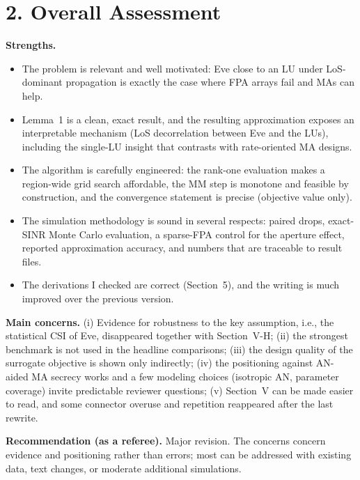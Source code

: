 \documentclass[10.5pt,a4paper]{article}
\begin{document}
\section*{2. Overall Assessment}
\textbf{Strengths.}
\begin{itemize}
\item The problem is relevant and well motivated: Eve close to an LU under LoS-dominant propagation is exactly the case where FPA arrays fail and MAs can help.
\item Lemma~1 is a clean, exact result, and the resulting approximation exposes an interpretable mechanism (LoS decorrelation between Eve and the LUs), including the single-LU insight that contrasts with rate-oriented MA designs.
\item The algorithm is carefully engineered: the rank-one evaluation makes a region-wide grid search affordable, the MM step is monotone and feasible by construction, and the convergence statement is precise (objective value only).
\item The simulation methodology is sound in several respects: paired drops, exact-SINR Monte Carlo evaluation, a sparse-FPA control for the aperture effect, reported approximation accuracy, and numbers that are traceable to result files.
\item The derivations I checked are correct (Section~5), and the writing is much improved over the previous version.
\end{itemize}
\textbf{Main concerns.} (i) Evidence for robustness to the key assumption, i.e., the statistical CSI of Eve, disappeared together with Section~V-H; (ii) the strongest benchmark is not used in the headline comparisons; (iii) the design quality of the surrogate objective is shown only indirectly; (iv) the positioning against AN-aided MA secrecy works and a few modeling choices (isotropic AN, parameter coverage) invite predictable reviewer questions; (v) Section~V can be made easier to read, and some connector overuse and repetition reappeared after the last rewrite.

\textbf{Recommendation (as a referee).} Major revision. The concerns concern evidence and positioning rather than errors; most can be addressed with existing data, text changes, or moderate additional simulations.
\end{document}
